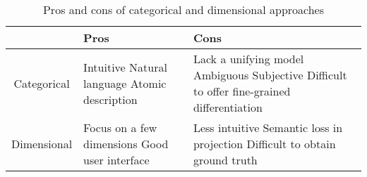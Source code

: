 \begin{table}[h!]
	\centering
	\begin{tabular}{|c|p{}|p{}|}
	\hline
	& Pros & Cons\\ [0.5ex] 
	\hline\hline Categorical & Intuitive \newline Natural language \newline Atomic description & Lack a unifying model \newline Ambiguous \newline Subjective \newline Difficult to offer fine-grained differentiation \\
	\hline Dimensional & Focus on a few dimensions \newline Good user interface & Less intuitive \newline Semantic loss in projection \newline Difficult to obtain ground truth \\
	\hline
	\end{tabular}
	\caption{Pros and cons of categorical and dimensional approaches}
	\label{table:pros_cons_categorical_dimensional}
\end{table}

